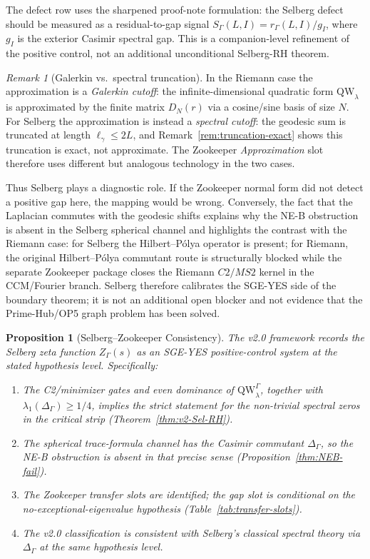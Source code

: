 \documentclass[12pt,a4paper]{article}
\newtheorem{proposition}[theorem]{Proposition}
\theoremstyle{definition}
\theoremstyle{remark}
\newtheorem{remark}[theorem]{Remark}
\newcommand{\QW}{\mathrm{QW}}
\newcommand{\Sel}{Z_{\Gamma}}
\newcommand{\Delop}{\Delta_{\Gamma}}
\begin{document}
The defect row uses the sharpened proof-note formulation: the Selberg
defect should be measured as a residual-to-gap signal
$S_\Gamma(L,I)=r_\Gamma(L,I)/g_I$, where $g_I$ is the exterior Casimir
spectral gap.  This is a companion-level refinement of the positive control,
not an additional unconditional Selberg-RH theorem.

\begin{remark}[Galerkin vs.\ spectral truncation]
\label{rem:galerkin-vs-spectral}
In the Riemann case the approximation is a \emph{Galerkin cutoff}: the
infinite-dimensional quadratic form $\QW_\lambda$ is approximated by the
finite matrix $D_N(r)$ via a cosine/sine basis of size $N$.  For Selberg
the approximation is instead a \emph{spectral cutoff}: the geodesic sum is
truncated at length $\ell_\gamma \le 2L$, and Remark~\ref{rem:truncation-exact}
shows this truncation is exact, not approximate.  The Zookeeper \emph{Approximation} slot
therefore uses different but analogous technology in the two cases.
\end{remark}

Thus Selberg plays a diagnostic role.  If the Zookeeper normal form did
not detect a positive gap here, the mapping would be wrong.  Conversely,
the fact that the Laplacian commutes with the geodesic shifts explains
why the NE-B obstruction is absent in the Selberg spherical channel and highlights the contrast with
the Riemann case: for Selberg the Hilbert--Pólya operator is present; for
Riemann, the original Hilbert--Pólya commutant route is structurally
blocked while the separate Zookeeper package closes the Riemann $C2/MS2$
kernel in the CCM/Fourier branch.  Selberg therefore calibrates the
SGE-YES side of the boundary theorem; it is not an additional open blocker
and not evidence that the Prime-Hub/OP5 graph problem has been solved.

\begin{proposition}[Selberg--Zookeeper Consistency]
\label{prop:selberg-zookeeper}
The v2.0 framework records the Selberg zeta function
$\Sel(s)$ as an SGE-YES positive-control system at the stated hypothesis level.
Specifically:
\begin{enumerate}[label=(\roman*)]
  \item The C2/minimizer gates and even dominance of $\QW^\Gamma_\lambda$, together with
    $\lambda_1(\Delop)\ge 1/4$, implies the strict statement for the
    non-trivial spectral zeros in the critical strip (Theorem~\ref{thm:v2-Sel-RH}).
  \item The spherical trace-formula channel has the Casimir commutant
    $\Delop$, so the NE-B obstruction is absent in that precise sense
    (Proposition~\ref{thm:NEB-fail}).
  \item The Zookeeper transfer slots are identified; the gap slot is
    conditional on the no-exceptional-eigenvalue hypothesis
    (Table~\ref{tab:transfer-slots}).
  \item The v2.0 classification is consistent with Selberg's classical
    spectral theory via $\Delop$ at the same hypothesis level.
\end{enumerate}
\end{proposition}
\end{document}
